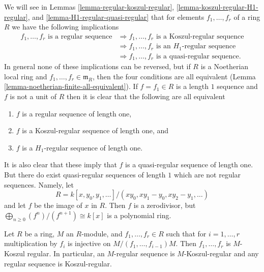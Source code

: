 \noindent
We will see in Lemmas \ref{lemma-regular-koszul-regular},
\ref{lemma-koszul-regular-H1-regular}, and
\ref{lemma-H1-regular-quasi-regular} that for elements
$f_1, \ldots, f_r$ of a ring $R$ we have the following implications
\begin{align*}
f_1, \ldots, f_r\text{ is a regular sequence}
& \Rightarrow f_1, \ldots, f_r\text{ is a Koszul-regular sequence} \\
& \Rightarrow f_1, \ldots, f_r\text{ is an }H_1\text{-regular sequence} \\
& \Rightarrow f_1, \ldots, f_r\text{ is a quasi-regular sequence.}
\end{align*}
In general none of these implications can be reversed, but if $R$ is
a Noetherian local ring and $f_1, \ldots, f_r \in \mathfrak m_R$,
then the four conditions are all equivalent
(Lemma \ref{lemma-noetherian-finite-all-equivalent}).
If $f = f_1 \in R$ is a length $1$ sequence and $f$ is not a unit of $R$
then it is clear that the following are all equivalent
\begin{enumerate}
\item $f$ is a regular sequence of length one,
\item $f$ is a Koszul-regular sequence of length one, and
\item $f$ is a $H_1$-regular sequence of length one.
\end{enumerate}
It is also clear that these imply that $f$ is a quasi-regular sequence
of length one. But there do exist quasi-regular sequences of length $1$
which are not regular sequences. Namely, let
$$
R = k[x, y_0, y_1, \ldots]/(xy_0, xy_1 - y_0, xy_2 - y_1, \ldots)
$$
and let $f$ be the image of $x$ in $R$. Then $f$ is a zerodivisor, but
$\bigoplus_{n \geq 0} (f^n)/(f^{n + 1}) \cong k[x]$ is a polynomial ring.

\begin{lemma}
\label{lemma-regular-koszul-regular}
Let $R$ be a ring, $M$ an $R$-module, and $f_1, \ldots, f_r \in R$
such that for $i = 1, \ldots, r$ multiplication by $f_i$
is injective on $M/(f_1, \ldots, f_{i - 1})M$. Then $f_1, \ldots, f_r$
is $M$-Koszul regular. In particular, an $M$-regular sequence
is $M$-Koszul-regular and any regular sequence is Koszul-regular.
\end{lemma}

